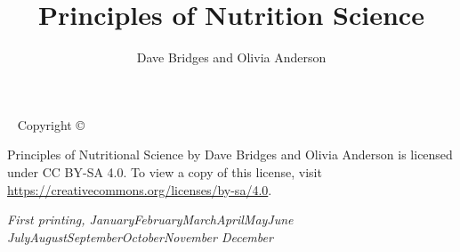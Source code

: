\documentclass{tufte-book}
\title{Principles of Nutrition Science}
\author[Dave Bridges and Olivia S. Anderson]{Dave Bridges and Olivia Anderson}
\newcommand{\monthyear}{%
  \ifcase\month\or January\or February\or March\or April\or May\or June\or
  July\or August\or September\or October\or November\or
  December\fi\space\number\year
}
\newcommand{\openepigraph}[2]{%
  \begin{fullwidth}
  \sffamily\large
  \begin{doublespace}
  \noindent\allcaps{#1}\\%
  \noindent\allcaps{#2}%
  \end{doublespace}
  \end{fullwidth}
}
\newcommand{\blankpage}{\newpage\hbox{}\thispagestyle{empty}\newpage}
\begin{document}
\frontmatter




\maketitle


\newpage
\begin{fullwidth}
~\vfill
\thispagestyle{empty}
\setlength{\parindent}{0pt}
\setlength{\parskip}{\baselineskip}
Copyright \copyright\ \the\year\ \thanklessauthor

\par{}


\par Principles of Nutritional Science by Dave Bridges and Olivia Anderson is licensed under CC BY-SA 4.0. To view a copy of this license, visit \url{https://creativecommons.org/licenses/by-sa/4.0}.

\par\textit{First printing, \monthyear}
\end{fullwidth}

\tableofcontents

\listoffigures

\listoftables

\end{document}
